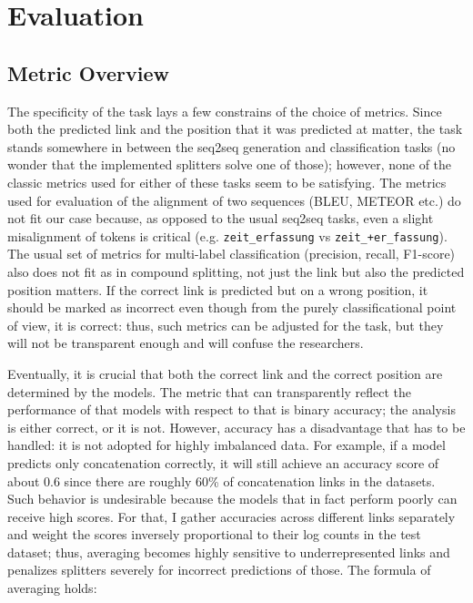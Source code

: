 \documentclass[11pt]{article}
\begin{document}
\section{Evaluation}
\label{sec:eval}

\subsection{Metric Overview}

The specificity of the task lays a few constrains of the choice of metrics. Since both the predicted link and the position that it was predicted at matter, the task stands somewhere in between the seq2seq generation and classification tasks (no wonder that the implemented splitters solve one of those); however, none of the classic metrics used for either of these tasks seem to be satisfying. The metrics used for evaluation of the alignment of two sequences (BLEU, METEOR etc.) do not fit our case because, as opposed to the usual seq2seq tasks, even a slight misalignment of tokens is critical (e.g. \texttt{zeit\_erfassung} vs \texttt{zeit\_+er\_fassung}). The usual set of metrics for multi-label classification (precision, recall, F1-score) also does not fit as in compound splitting, not just the link but also the predicted position matters. If the correct link is predicted but on a wrong position, it should be marked as incorrect even though from the purely classificational point of view, it is correct: thus, such metrics can be adjusted for the task, but they will not be transparent enough and will confuse the researchers.

Eventually, it is crucial that both the correct link and the correct position are determined by the models. The metric that can transparently reflect the performance of that models with respect to that is binary accuracy; the analysis is either correct, or it is not. However, accuracy has a disadvantage that has to be handled: it is not adopted for highly imbalanced data. For example, if a model predicts only concatenation correctly, it will still achieve an accuracy score of about 0.6 since there are roughly 60\% of concatenation links in the datasets. Such behavior is undesirable because the models that in fact perform poorly can receive high scores. For that, I gather accuracies across different links separately and weight the scores inversely proportional to their log counts in the test dataset; thus, averaging becomes highly sensitive to underrepresented links and penalizes splitters severely for incorrect predictions of those. The formula of averaging holds:
\end{document}

